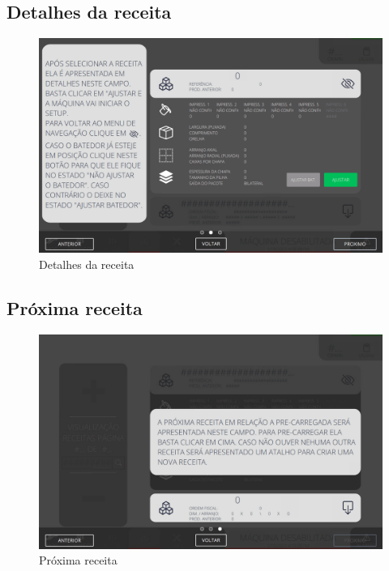 \newpage
\thispagestyle{fancy}
\vspace*{40 pt}
\subsection{\small Detalhes da receita}
\vspace*{\fill}
\begin{figure}[h]
    \centering
    \includegraphics[width=576 px,height=360 px]{src/imagesICV/09-request/visualization/e-5.png}
    \caption{Detalhes da receita}
\end{figure}
\vspace*{\fill}

\newpage
\thispagestyle{fancy}
\vspace*{40 pt}
\subsection{\small Próxima receita}
\vspace*{\fill}
\begin{figure}[h]
    \centering
    \includegraphics[width=576 px,height=360 px]{src/imagesICV/09-request/visualization/e-6.png}
    \caption{Próxima receita}
\end{figure}
\vspace*{\fill}
